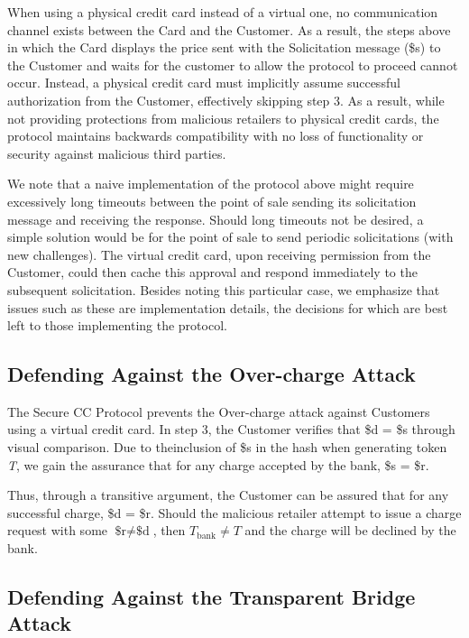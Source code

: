 When using a physical credit card instead of a virtual one, no communication channel exists between the Card and the Customer.
As a result, the steps above in which the Card displays the price sent with the Solicitation message (\$s) to the Customer and waits for the customer to allow the protocol to proceed cannot occur.
Instead, a physical credit card must implicitly assume successful authorization from the Customer, effectively skipping step 3.
As a result, while not providing protections from malicious retailers to physical credit cards, the protocol maintains backwards compatibility with no loss of functionality or security against malicious third parties.

We note that a naive implementation of the protocol above might require excessively long timeouts between the point of sale sending its solicitation message and receiving the response.
Should long timeouts not be desired, a simple solution would be for the point of sale to send periodic solicitations (with new challenges).
The virtual credit card, upon receiving permission from the Customer, could then cache this approval and respond immediately to the subsequent solicitation.
Besides noting this particular case, we emphasize that issues such as these are implementation details, the decisions for which are best left to those implementing the protocol.

\subsection{Defending Against the Over-charge Attack}

The Secure CC Protocol prevents the Over-charge attack against Customers using a virtual credit card.
In step 3, the Customer verifies that \$d = \$s through visual comparison.
Due to theinclusion of \$s in the hash when generating token \emph{T}, we gain the assurance that for any charge accepted by the bank, \$s = \$r.

Thus, through a transitive argument, the Customer can be assured that for any successful charge, \$d = \$r.
Should the malicious retailer attempt to issue a charge request with some $\text{\$r} \neq \text{\$d}$, then $T_{\text{bank}} \neq T$ and the charge will be declined by the bank.

\subsection{Defending Against the Transparent Bridge Attack}

